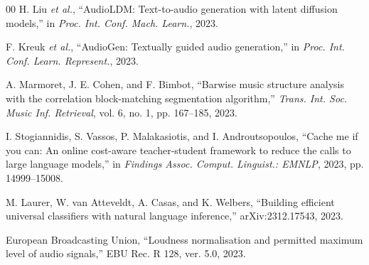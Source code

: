 \documentclass[conference]{IEEEtran}
\begin{document}
\begin{thebibliography}{00}
 H. Liu \emph{et al.}, ``AudioLDM: Text-to-audio generation with latent diffusion models,'' in \emph{Proc. Int. Conf. Mach. Learn.}, 2023.

 F. Kreuk \emph{et al.}, ``AudioGen: Textually guided audio generation,'' in \emph{Proc. Int. Conf. Learn. Represent.}, 2023.

 A. Marmoret, J. E. Cohen, and F. Bimbot, ``Barwise music structure analysis with the correlation block-matching segmentation algorithm,'' \emph{Trans. Int. Soc. Music Inf. Retrieval}, vol. 6, no. 1, pp. 167--185, 2023.

 I. Stogiannidis, S. Vassos, P. Malakasiotis, and I. Androutsopoulos, ``Cache me if you can: An online cost-aware teacher-student framework to reduce the calls to large language models,'' in \emph{Findings Assoc. Comput. Linguist.: EMNLP}, 2023, pp. 14999--15008.

 M. Laurer, W. van Atteveldt, A. Casas, and K. Welbers, ``Building efficient universal classifiers with natural language inference,'' arXiv:2312.17543, 2023.

 European Broadcasting Union, ``Loudness normalisation and permitted maximum level of audio signals,'' EBU Rec. R 128, ver. 5.0, 2023.

\end{thebibliography}
\end{document}
